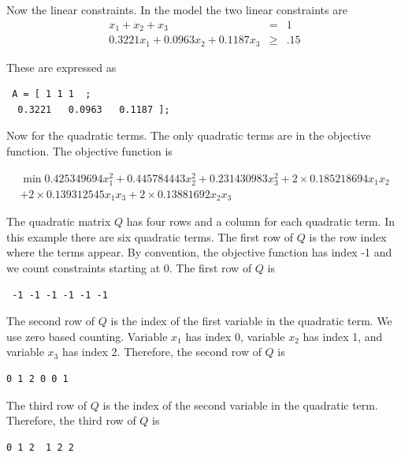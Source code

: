 \documentclass[11pt]{article}
\renewcommand{\_}{{\char"5F}}
\renewcommand{\{}{{\char"7B}}
\renewcommand{\}}{{\char"7D}}
\renewcommand{\^}{{\char"0D}}
\renewcommand{\'}{{\char"0D}}
\begin{document}
\begin{enumerate}[Step 1:]
 Now the linear constraints.   In the model the two linear constraints are
 \begin{eqnarray*}
 x_{1} + x_{2} + x_{3} &=& 1 \\
 0.3221 x_{1} +   0.0963x_{2} +    0.1187x_{3}  &\ge& .15
 \end{eqnarray*}



 These are expressed as



 \begin{verbatim}
 A = [ 1 1 1  ;
  0.3221   0.0963   0.1187 ];
 \end{verbatim}


Now for the quadratic terms. The only quadratic terms are in the objective function. The objective function is


\begin{eqnarray*}
\min  0.425349694 x_{1}^{2} +  0.445784443 x_{2}^{2} + 0.231430983 x_{3}^{2} + 2 \times 0.185218694 x_{1} x_{2} \\ 
+ 2 \times 0.139312545 x_{1} x_{3} + 2 \times 0.13881692 x_{2} x_{3}
\end{eqnarray*}


 The quadratic matrix $Q$ has four rows and a column for each quadratic term. In this example there are six quadratic terms.  The first row of $Q$ is the row index where the terms appear. By convention, the objective function has index -1 and we count constraints starting at 0.  The first row of $Q$ is


 \begin{verbatim}
 -1 -1 -1 -1 -1 -1
 \end{verbatim}

The second row of $Q$ is the index of the first variable in the quadratic term. We use zero based counting.  Variable $x_{1}$ has index 0, variable  $x_{2}$ has index 1, and variable $x_{3}$ has index 2.  Therefore, the second row of $Q$ is



\begin{verbatim}
0 1 2 0 0 1
\end{verbatim}



The third row of $Q$ is the index of the second variable in the quadratic term.   Therefore, the third row of $Q$ is



\begin{verbatim}
0 1 2  1 2 2
\end{verbatim}




\end{enumerate}
\end{document}
